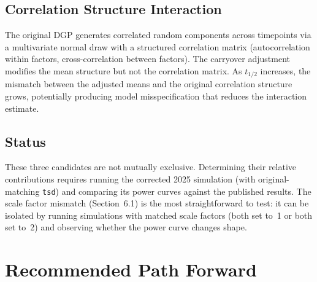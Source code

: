 \documentclass[11pt]{article}
\begin{document}
\subsection{Correlation Structure Interaction}

The original DGP generates correlated random components across
timepoints via a multivariate normal draw with a structured
correlation matrix (autocorrelation within factors, cross-correlation
between factors). The carryover adjustment modifies the mean structure
but not the correlation matrix. As $t_{1/2}$ increases, the mismatch
between the adjusted means and the original correlation structure
grows, potentially producing model misspecification that reduces the
interaction estimate.

\subsection{Status}

These three candidates are not mutually exclusive. Determining their
relative contributions requires running the corrected 2025 simulation
(with original-matching \texttt{tsd}) and comparing its power curves
against the published results. The scale factor mismatch
(Section~6.1) is the most straightforward to test: it can be isolated
by running simulations with matched scale factors (both set to~1 or
both set to~2) and observing whether the power curve changes shape.

\section{Recommended Path Forward}
\label{sec:fix}
\end{document}
